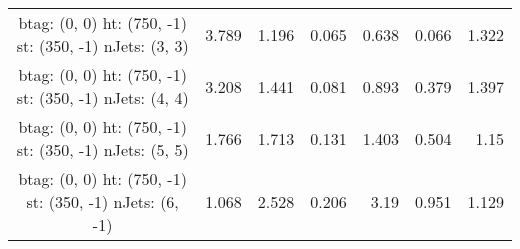 \documentclass[12pt]{paper}
\begin{document}
\begin{landscape}
\begin{longtable}{c|r|r|r|r|r|r}
btag:  (0, 0) ht:  (750, -1) st:  (350, -1) nJets:  (3, 3)
 & 3.789 & 1.196 & 0.065 & 0.638 & 0.066 & 1.322\\
btag:  (0, 0) ht:  (750, -1) st:  (350, -1) nJets:  (4, 4)
 & 3.208 & 1.441 & 0.081 & 0.893 & 0.379 & 1.397\\
btag:  (0, 0) ht:  (750, -1) st:  (350, -1) nJets:  (5, 5)
 & 1.766 & 1.713 & 0.131 & 1.403 & 0.504 & 1.15\\
btag:  (0, 0) ht:  (750, -1) st:  (350, -1) nJets:  (6, -1)
 & 1.068 & 2.528 & 0.206 & 3.19 & 0.951 & 1.129\\
\end{longtable}
\end{landscape}
\end{document}
